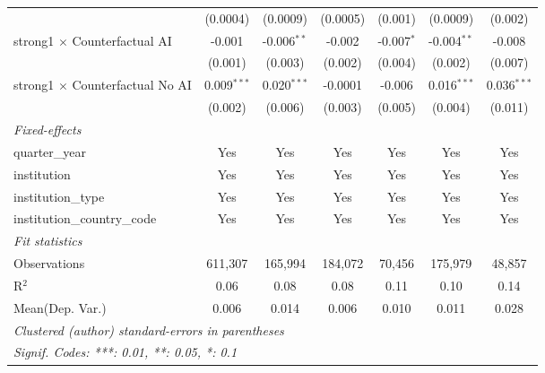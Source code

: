 \begin{tabular}{lcccccc}
                                          & (0.0004)      & (0.0009)      & (0.0005)      & (0.001)       & (0.0009)      & (0.002)\\   
   strong1 $\times$ Counterfactual AI     & -0.001        & -0.006$^{**}$ & -0.002        & -0.007$^{*}$  & -0.004$^{**}$ & -0.008\\   
                                          & (0.001)       & (0.003)       & (0.002)       & (0.004)       & (0.002)       & (0.007)\\   
   strong1 $\times$ Counterfactual No AI  & 0.009$^{***}$ & 0.020$^{***}$ & -0.0001       & -0.006        & 0.016$^{***}$ & 0.036$^{***}$\\   
                                          & (0.002)       & (0.006)       & (0.003)       & (0.005)       & (0.004)       & (0.011)\\   
   \midrule
   \emph{Fixed-effects}\\
   quarter\_year                          & Yes           & Yes           & Yes           & Yes           & Yes           & Yes\\  
   institution                            & Yes           & Yes           & Yes           & Yes           & Yes           & Yes\\  
   institution\_type                      & Yes           & Yes           & Yes           & Yes           & Yes           & Yes\\  
   institution\_country\_code             & Yes           & Yes           & Yes           & Yes           & Yes           & Yes\\  
   \midrule
   \emph{Fit statistics}\\
   Observations                           & 611,307       & 165,994       & 184,072       & 70,456        & 175,979       & 48,857\\  
   R$^2$                                  & 0.06          & 0.08          & 0.08          & 0.11          & 0.10          & 0.14\\  
Mean(Dep. Var.) & 0.006 & 0.014 & 0.006 & 0.010 & 0.011 & 0.028 \\
   \midrule \midrule
   \multicolumn{7}{l}{\emph{Clustered (author) standard-errors in parentheses}}\\
   \multicolumn{7}{l}{\emph{Signif. Codes: ***: 0.01, **: 0.05, *: 0.1}}\\
\end{tabular}
\par\endgroup
